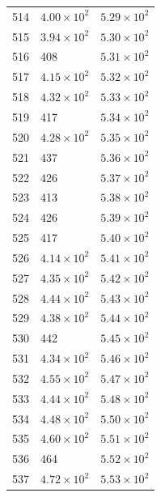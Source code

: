 \begin{table}[H]
\begin{tabular}{lll}
514 & $\displaystyle 4.00 \times 10^{2}$ & $\displaystyle 5.29 \times 10^{2}$ \\
515 & $\displaystyle 3.94 \times 10^{2}$ & $\displaystyle 5.30 \times 10^{2}$ \\
516 & 408 & $\displaystyle 5.31 \times 10^{2}$ \\
517 & $\displaystyle 4.15 \times 10^{2}$ & $\displaystyle 5.32 \times 10^{2}$ \\
518 & $\displaystyle 4.32 \times 10^{2}$ & $\displaystyle 5.33 \times 10^{2}$ \\
519 & 417 & $\displaystyle 5.34 \times 10^{2}$ \\
520 & $\displaystyle 4.28 \times 10^{2}$ & $\displaystyle 5.35 \times 10^{2}$ \\
521 & 437 & $\displaystyle 5.36 \times 10^{2}$ \\
522 & 426 & $\displaystyle 5.37 \times 10^{2}$ \\
523 & 413 & $\displaystyle 5.38 \times 10^{2}$ \\
524 & 426 & $\displaystyle 5.39 \times 10^{2}$ \\
525 & 417 & $\displaystyle 5.40 \times 10^{2}$ \\
526 & $\displaystyle 4.14 \times 10^{2}$ & $\displaystyle 5.41 \times 10^{2}$ \\
527 & $\displaystyle 4.35 \times 10^{2}$ & $\displaystyle 5.42 \times 10^{2}$ \\
528 & $\displaystyle 4.44 \times 10^{2}$ & $\displaystyle 5.43 \times 10^{2}$ \\
529 & $\displaystyle 4.38 \times 10^{2}$ & $\displaystyle 5.44 \times 10^{2}$ \\
530 & 442 & $\displaystyle 5.45 \times 10^{2}$ \\
531 & $\displaystyle 4.34 \times 10^{2}$ & $\displaystyle 5.46 \times 10^{2}$ \\
532 & $\displaystyle 4.55 \times 10^{2}$ & $\displaystyle 5.47 \times 10^{2}$ \\
533 & $\displaystyle 4.44 \times 10^{2}$ & $\displaystyle 5.48 \times 10^{2}$ \\
534 & $\displaystyle 4.48 \times 10^{2}$ & $\displaystyle 5.50 \times 10^{2}$ \\
535 & $\displaystyle 4.60 \times 10^{2}$ & $\displaystyle 5.51 \times 10^{2}$ \\
536 & 464 & $\displaystyle 5.52 \times 10^{2}$ \\
537 & $\displaystyle 4.72 \times 10^{2}$ & $\displaystyle 5.53 \times 10^{2}$ \\

\end{tabular}
\end{table}
